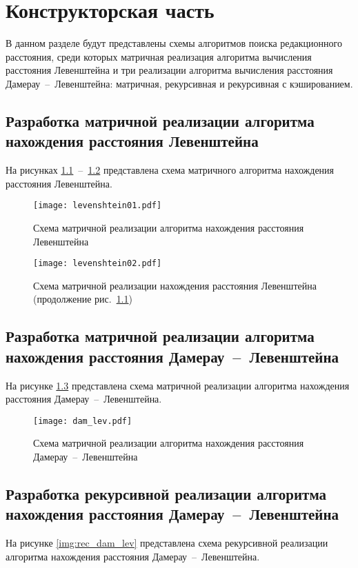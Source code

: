 \chapter{Конструкторская часть}

В данном разделе будут представлены схемы алгоритмов поиска редакционного расстояния, среди которых матричная реализация алгоритма вычисления расстояния Левенштейна и три реализации алгоритма вычисления расстояния Дамерау~--~Левенштейна: матричная, рекурсивная и рекурсивная с кэшированием.

\section{Разработка матричной реализации алгоритма нахождения расстояния Левенштейна}
На рисунках \ref{img:lev01}~--~\ref{img:lev02} представлена схема матричного алгоритма нахождения расстояния Левенштейна.

\begin{figure}[h!]
\centering
    \texttt{[image: levenshtein01.pdf]}
    \caption{Схема матричной реализации алгоритма нахождения расстояния Левенштейна}
    \label{img:lev01}	
\end{figure}

\newpage

\begin{figure}[h!]
    \centering
    \texttt{[image: levenshtein02.pdf]}
    \caption{Схема матричной реализации нахождения расстояния Левенштейна (продолжение рис.~\ref{img:lev01})}
    \label{img:lev02}
\end{figure}

\newpage

\section{Разработка матричной реализации алгоритма нахождения расстояния Дамерау~--~Левенштейна}
На рисунке \ref{img:dam_lev} представлена схема матричной реализации алгоритма нахождения расстояния Дамерау~--~Левенштейна. 

\begin{figure}[h!]
    \centering
    \texttt{[image: dam\_lev.pdf]}
    \caption{Схема матричной реализации алгоритма нахождения расстояния Дамерау~--~Левенштейна}
    \label{img:dam_lev}
\end{figure}

\section{Разработка рекурсивной реализации алгоритма нахождения расстояния Дамерау~--~Левенштейна}
На рисунке \ref{img:rec_dam_lev} представлена схема рекурсивной реализации алгоритма нахождения расстояния Дамерау~--~Левенштейна.

